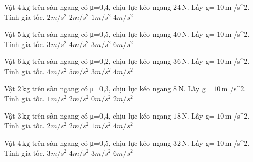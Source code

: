 \begin{ex}
Vật $4\,\text{kg}$ trên sàn ngang có μ=0,4, chịu lực kéo ngang $24\,\text{N}$. Lấy g= $10\,\text{m}$ /s^2. Tính gia tốc.
\choice
{$2 m/s^2$}
{\True $2 m/s^2$}
{$1 m/s^2$}
{$4 m/s^2$}
\end{ex}

\begin{ex}
Vật $5\,\text{kg}$ trên sàn ngang có μ=0,5, chịu lực kéo ngang $40\,\text{N}$. Lấy g= $10\,\text{m}$ /s^2. Tính gia tốc.
\choice
{$3 m/s^2$}
{$4 m/s^2$}
{\True $3 m/s^2$}
{$6 m/s^2$}
\end{ex}

\begin{ex}
Vật $6\,\text{kg}$ trên sàn ngang có μ=0,2, chịu lực kéo ngang $36\,\text{N}$. Lấy g= $10\,\text{m}$ /s^2. Tính gia tốc.
\choice
{$4 m/s^2$}
{$5 m/s^2$}
{$3 m/s^2$}
{\True $4 m/s^2$}
\end{ex}

\begin{ex}
Vật $2\,\text{kg}$ trên sàn ngang có μ=0,3, chịu lực kéo ngang $8\,\text{N}$. Lấy g= $10\,\text{m}$ /s^2. Tính gia tốc.
\choice
{\True $1 m/s^2$}
{$2 m/s^2$}
{$0 m/s^2$}
{$2 m/s^2$}
\end{ex}

\begin{ex}
Vật $3\,\text{kg}$ trên sàn ngang có μ=0,4, chịu lực kéo ngang $18\,\text{N}$. Lấy g= $10\,\text{m}$ /s^2. Tính gia tốc.
\choice
{$2 m/s^2$}
{\True $2 m/s^2$}
{$1 m/s^2$}
{$4 m/s^2$}
\end{ex}

\begin{ex}
Vật $4\,\text{kg}$ trên sàn ngang có μ=0,5, chịu lực kéo ngang $32\,\text{N}$. Lấy g= $10\,\text{m}$ /s^2. Tính gia tốc.
\choice
{$3 m/s^2$}
{$4 m/s^2$}
{\True $3 m/s^2$}
{$6 m/s^2$}
\end{ex}

